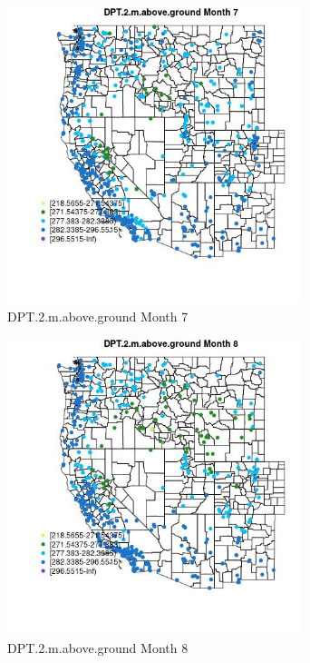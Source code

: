 \begin{figure} 
\centering  
\includegraphics[width=0.77\textwidth]{Code_Outputs/Report_ML_input_PM25_Step4_part_e_de_duplicated_aves_compiled_2019-05-14wNAs_MapObsMo7DPT2maboveground.jpg} 
\caption{\label{fig:Report_ML_input_PM25_Step4_part_e_de_duplicated_aves_compiled_2019-05-14wNAsMapObsMo7DPT2maboveground}DPT.2.m.above.ground Month 7} 
\end{figure} 
 

\begin{figure} 
\centering  
\includegraphics[width=0.77\textwidth]{Code_Outputs/Report_ML_input_PM25_Step4_part_e_de_duplicated_aves_compiled_2019-05-14wNAs_MapObsMo8DPT2maboveground.jpg} 
\caption{\label{fig:Report_ML_input_PM25_Step4_part_e_de_duplicated_aves_compiled_2019-05-14wNAsMapObsMo8DPT2maboveground}DPT.2.m.above.ground Month 8} 
\end{figure} 
 

